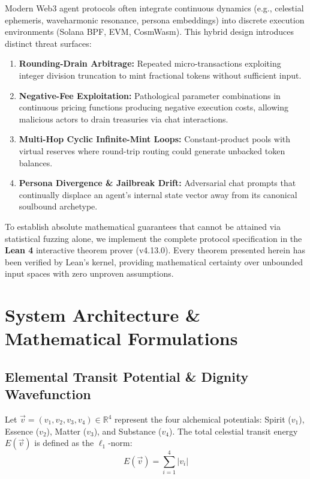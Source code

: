 \documentclass[11pt,a4paper]{article}
\theoremstyle{plain}
\theoremstyle{definition}
\theoremstyle{remark}
\begin{document}
Modern Web3 agent protocols often integrate continuous dynamics (e.g., celestial ephemeris, waveharmonic resonance, persona embeddings) into discrete execution environments (Solana BPF, EVM, CosmWasm). This hybrid design introduces distinct threat surfaces:
\begin{enumerate}
    \item \textbf{Rounding-Drain Arbitrage:} Repeated micro-transactions exploiting integer division truncation to mint fractional tokens without sufficient input.
    \item \textbf{Negative-Fee Exploitation:} Pathological parameter combinations in continuous pricing functions producing negative execution costs, allowing malicious actors to drain treasuries via chat interactions.
    \item \textbf{Multi-Hop Cyclic Infinite-Mint Loops:} Constant-product pools with virtual reserves where round-trip routing could generate unbacked token balances.
    \item \textbf{Persona Divergence \& Jailbreak Drift:} Adversarial chat prompts that continually displace an agent's internal state vector away from its canonical soulbound archetype.
\end{enumerate}

To establish absolute mathematical guarantees that cannot be attained via statistical fuzzing alone, we implement the complete protocol specification in the \textbf{Lean 4} interactive theorem prover (v4.13.0). Every theorem presented herein has been verified by Lean's kernel, providing mathematical certainty over unbounded input spaces with zero unproven assumptions.

\section{System Architecture \& Mathematical Formulations}

\subsection{Elemental Transit Potential \& Dignity Wavefunction}

Let $\vec{v} = (v_1, v_2, v_3, v_4) \in \mathbb{R}^4$ represent the four alchemical potentials: Spirit ($v_1$), Essence ($v_2$), Matter ($v_3$), and Substance ($v_4$). The total celestial transit energy $E(\vec{v})$ is defined as the $\ell_1$-norm:
\begin{equation}
    E(\vec{v}) = \sum_{i=1}^4 |v_i|
\end{equation}
\end{document}
